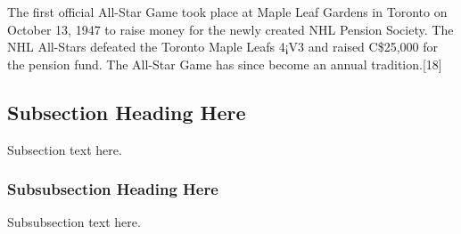 \documentclass[conference]{IEEEtran}
\begin{document}
The first official All-Star Game took place at Maple Leaf Gardens in
Toronto on October 13, 1947 to raise money for the newly created NHL
Pension Society. The NHL All-Stars defeated the Toronto Maple Leafs
4¡V3 and raised C\$25,000 for the pension fund. The All-Star Game has
since become an annual tradition.[18]

\subsection{Subsection Heading Here}
Subsection text here.


\subsubsection{Subsubsection Heading Here}
Subsubsection text here.


%
%

\end{document}
